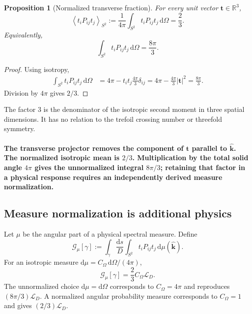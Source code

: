 \documentclass[aps,pre,preprint,notitlepage,nofootinbib,superscriptaddress]{revtex4-2}
\newcommand{\dd}{\mathrm d}
\newcommand{\RR}{\mathbb R}
\newcommand{\calL}{\mathcal L}
\newcommand{\calG}{\mathcal G}
\newcommand{\unitvec}[1]{\widehat{\bm #1}}
\newtheorem{proposition}{Proposition}
\begin{document}
\begin{proposition}[Normalized transverse fraction]
For every unit vector $\bm t\in\RR^3$,
\begin{equation}
  \boxed{
  \left\langle t_iP_{ij}t_j\right\rangle_{S^2}
  :=\frac{1}{4\pi}\int_{S^2}t_iP_{ij}t_j\,\dd\Omega
  =\frac23.}
  \label{eq:normalized-23}
\end{equation}
Equivalently,
\begin{equation}
  \boxed{\int_{S^2}t_iP_{ij}t_j\,\dd\Omega=\frac{8\pi}{3}.}
  \label{eq:unnormalized-8pi3}
\end{equation}
\end{proposition}

\begin{proof}
Using isotropy,
\begin{align}
  \int_{S^2}t_iP_{ij}t_j\,\dd\Omega
  &=4\pi-t_it_j\frac{4\pi}{3}\delta_{ij}
  =4\pi-\frac{4\pi}{3}|\bm t|^2
  =\frac{8\pi}{3}.
\end{align}
Division by $4\pi$ gives $2/3$.
\end{proof}

The factor $3$ is the denominator of the isotropic second moment in three spatial dimensions.  It has no relation to the trefoil crossing number or threefold symmetry.





    \paragraph{The transverse projector removes the component of $\bm t$ parallel to $\unitvec{k}$.  The normalized isotropic mean is $2/3$.  Multiplication by the total solid angle $4\pi$ gives the unnormalized integral $8\pi/3$; retaining that factor in a physical response requires an independently derived measure normalization.}







\subsection{Measure normalization is additional physics}

Let $\mu$ be the angular part of a physical spectral measure.  Define
\begin{equation}
  \calG_\mu[\gamma]
  :=\int_\gamma\frac{\dd s}{D}
  \int_{S^2}t_iP_{ij}t_j\,\dd\mu(\unitvec{k}).
\end{equation}
For an isotropic measure $\dd\mu=C_\Omega\,\dd\Omega/(4\pi)$,
\begin{equation}
  \calG_\mu[\gamma]=\frac23 C_\Omega\calL_D.
  \label{eq:general-measure}
\end{equation}
The unnormalized choice $\dd\mu=\dd\Omega$ corresponds to $C_\Omega=4\pi$ and reproduces $(8\pi/3)\calL_D$.  A normalized angular probability measure corresponds to $C_\Omega=1$ and gives $(2/3)\calL_D$.
\end{document}
